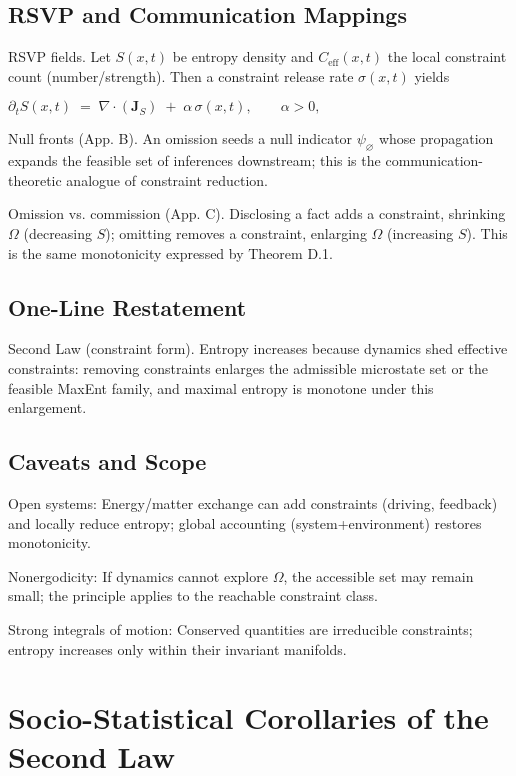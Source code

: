 \documentclass[12pt,a4paper]{article}
\begin{document}
\subsection{RSVP and Communication Mappings}

RSVP fields. Let $S(x,t)$ be entropy density and $C_{\mathrm{eff}}(x,t)$ the local constraint count (number/strength). Then a constraint release rate $\sigma(x,t)$ yields

$\partial_t S(x,t) \;=\; \nabla\!\cdot\!(\mathbf{J}_S) \;+\; \alpha\,\sigma(x,t), \qquad \alpha>0,$

Null fronts (App. B). An omission seeds a null indicator $\psi_{\varnothing}$ whose propagation expands the feasible set of inferences downstream; this is the communication-theoretic analogue of constraint reduction.

Omission vs. commission (App. C). Disclosing a fact adds a constraint, shrinking $\Omega$ (decreasing $S$); omitting removes a constraint, enlarging $\Omega$ (increasing $S$). This is the same monotonicity expressed by Theorem D.1.

\subsection{One-Line Restatement}

Second Law (constraint form). Entropy increases because dynamics shed effective constraints: removing constraints enlarges the admissible microstate set or the feasible MaxEnt family, and maximal entropy is monotone under this enlargement.

\subsection{Caveats and Scope}

Open systems: Energy/matter exchange can add constraints (driving, feedback) and locally reduce entropy; global accounting (system+environment) restores monotonicity.

Nonergodicity: If dynamics cannot explore $\Omega$, the accessible set may remain small; the principle applies to the reachable constraint class.

Strong integrals of motion: Conserved quantities are irreducible constraints; entropy increases only within their invariant manifolds.

\section{Socio-Statistical Corollaries of the Second Law}
\end{document}
